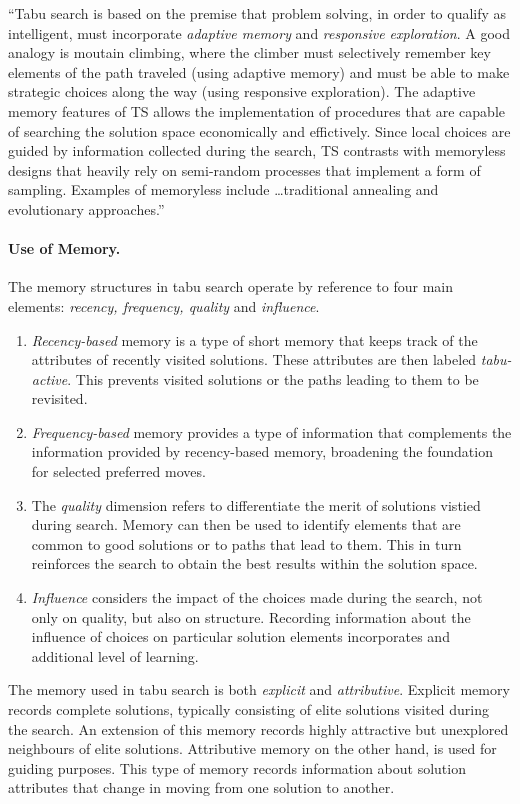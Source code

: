 ``Tabu search is based on the premise that problem solving, in order to qualify as intelligent, must incorporate \emph{adaptive memory} and \emph{responsive exploration}. A good analogy is moutain climbing, where the climber must selectively remember key elements of the path traveled (using adaptive memory) and must be able to make strategic choices along the way (using responsive exploration). The adaptive memory features of TS allows the implementation of procedures that are capable of searching the solution space economically and effictively. Since local choices are guided by information collected during the search, TS contrasts with memoryless designs that heavily rely on semi-random processes that implement a form of sampling. Examples of memoryless include \ldots traditional annealing and evolutionary approaches.'' \cite{glover97}

\paragraph{Use of Memory.} The memory structures in tabu search operate by reference to four main elements: \emph{recency, frequency, quality} and \emph{influence}.

\begin{enumerate}
\item \emph{Recency-based} memory is a type of short memory that keeps track of the attributes of recently visited solutions. These attributes are then labeled \emph{tabu-active}. This prevents visited solutions or the paths leading to them to be revisited.
\item \emph{Frequency-based} memory provides a type of information that complements the information provided by recency-based memory, broadening the foundation for selected preferred moves.
\item The \emph{quality} dimension refers to differentiate the merit of solutions vistied during search. Memory can then be used to identify elements that are common to good solutions or to paths that lead to them. This in turn reinforces the search to obtain the best results within the solution space.  
\item \emph{Influence} considers the impact of the choices made during the search, not only on quality, but also on structure. Recording information about the influence of choices on particular solution elements incorporates and additional level of learning.
\end{enumerate}

The memory used in tabu search is both \emph{explicit} and \emph{attributive}. Explicit memory records complete solutions, typically consisting of elite solutions visited during the search. An extension of this memory records highly attractive but unexplored neighbours of elite solutions. Attributive memory on the other hand, is used for guiding purposes. This type of memory records information about solution attributes that change in moving from one solution to another.

